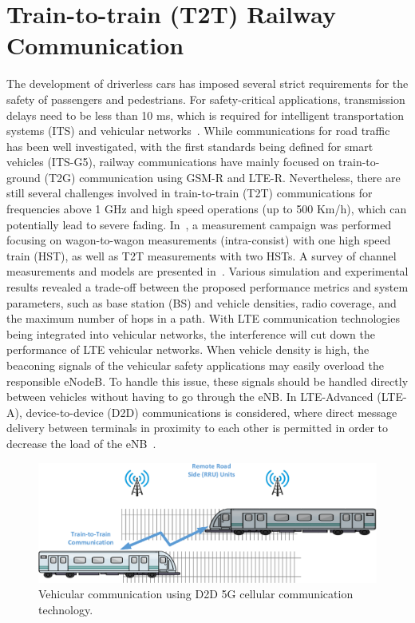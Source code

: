 \section{Train-to-train (T2T) Railway Communication}

The development of driverless cars has imposed several strict requirements for the safety of passengers and pedestrians. For safety-critical applications, transmission delays need to be less than 10 ms, which is required for intelligent transportation systems (ITS) and vehicular networks~\cite{ge2016vehicular}. While communications for road traffic has been well investigated, with the first standards being defined for smart vehicles (ITS-G5), railway communications have mainly focused on train-to-ground (T2G) communication using GSM-R and LTE-R. Nevertheless, there are still several challenges involved in train-to-train (T2T) communications for frequencies above 1 GHz and high speed operations (up to 500 Km/h), which can potentially lead to severe fading. In~\cite{nterhuber2017wide}, a measurement campaign was performed focusing on wagon-to-wagon measurements (intra-consist) with one high speed train (HST), as well as T2T measurements with two HSTs. A survey of channel measurements and models are presented in~\cite{unterhuber2016survey}. Various simulation and experimental results revealed a trade-off between the proposed performance metrics and system parameters, such as base station (BS) and vehicle densities, radio coverage, and  the  maximum number of hops in a path. With LTE communication technologies being integrated into vehicular networks, the interference will cut down the performance of LTE vehicular networks. When vehicle density is high, the beaconing signals of the vehicular safety applications may easily overload the responsible eNodeB. To handle this issue, these signals should be handled directly between vehicles without  having to go through  the  eNB. In  LTE-Advanced (LTE-A), device-to-device (D2D) communications is considered, where direct message delivery between terminals in proximity to each other is permitted in order to decrease the load of the eNB~\cite{mumtaz2014direct}. 

\begin{figure}[!ht]
	\centering
\includegraphics[width=\textwidth,keepaspectratio]{images/Gill/5G/vehiclecomm.eps}
	\caption{Vehicular communication using D2D 5G cellular communication technology.}
	\label{vcomm}
\end{figure}


